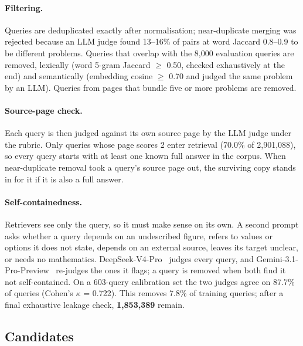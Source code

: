 \paragraph{Filtering.}
Queries are deduplicated exactly after normalisation; near-duplicate merging was rejected because an LLM judge found 13--16\% of pairs at word Jaccard 0.8--0.9 to be different problems. Queries that overlap with the 8,000 evaluation queries are removed, lexically (word 5-gram Jaccard $\geq$ 0.50, checked exhaustively at the end) and semantically (embedding cosine $\geq$ 0.70 and judged the same problem by an LLM). Queries from pages that bundle five or more problems are removed.

\paragraph{Source-page check.}
Each query is then judged against its own source page by the LLM judge under the rubric. Only queries whose page scores 2 enter retrieval (70.0\% of 2,901,088), so every query starts with at least one known full answer in the corpus. When near-duplicate removal took a query's source page out, the surviving copy stands in for it if it is also a full answer.

\paragraph{Self-containedness.}
Retrievers see only the query, so it must make sense on its own. A second prompt asks whether a query depends on an undescribed figure, refers to values or options it does not state, depends on an external source, leaves its target unclear, or needs no mathematics. DeepSeek-V4-Pro~\citep{deepseekai2026deepseekv4} judges every query, and Gemini-3.1-Pro-Preview~\citep{google2026gemini31pro} re-judges the ones it flags; a query is removed when both find it not self-contained. On a 603-query calibration set the two judges agree on 87.7\% of queries (Cohen's $\kappa$ = 0.722). This removes 7.8\% of training queries; after a final exhaustive leakage check, \textbf{1,853,389} remain.

\subsection{Candidates}
\label{sec:candidates}

